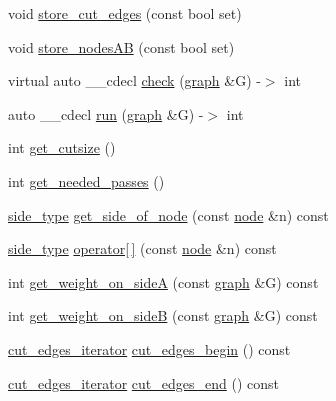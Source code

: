 \begin{DoxyCompactItemize}
\item 
void \mbox{\hyperlink{classfm__partition_ad0870674a1fb8e1c882f6855e32aec09}{store\+\_\+cut\+\_\+edges}} (const bool set)
\item 
void \mbox{\hyperlink{classfm__partition_a8926005b4637055d2acf6f29ad2d9b97}{store\+\_\+nodes\+AB}} (const bool set)
\item 
virtual auto \+\_\+\+\_\+cdecl \mbox{\hyperlink{classfm__partition_a2fadbf126742f659878132159653e102}{check}} (\mbox{\hyperlink{classgraph}{graph}} \&G) -\/$>$ int
\item 
auto \+\_\+\+\_\+cdecl \mbox{\hyperlink{classfm__partition_a509615ef1f11bc2334a96c35adafd28e}{run}} (\mbox{\hyperlink{classgraph}{graph}} \&G) -\/$>$ int
\item 
int \mbox{\hyperlink{classfm__partition_a42fa2e19fb3fde093a1a05d0bd6d8ad1}{get\+\_\+cutsize}} ()
\item 
int \mbox{\hyperlink{classfm__partition_aa8aa84286a6939d17175fbf646ba3176}{get\+\_\+needed\+\_\+passes}} ()
\item 
\mbox{\hyperlink{classfm__partition_a7cdff1bea3740a287387e8408e16ca79}{side\+\_\+type}} \mbox{\hyperlink{classfm__partition_af5f6ad817fe30760f3bc5470bd70c4c9}{get\+\_\+side\+\_\+of\+\_\+node}} (const \mbox{\hyperlink{classnode}{node}} \&n) const
\item 
\mbox{\hyperlink{classfm__partition_a7cdff1bea3740a287387e8408e16ca79}{side\+\_\+type}} \mbox{\hyperlink{classfm__partition_a45ef6bc577ce894ead2c699678e26f1b}{operator\mbox{[}$\,$\mbox{]}}} (const \mbox{\hyperlink{classnode}{node}} \&n) const
\item 
int \mbox{\hyperlink{classfm__partition_a3f1ddcff1ba7a4c4090f947f918b5331}{get\+\_\+weight\+\_\+on\+\_\+sideA}} (const \mbox{\hyperlink{classgraph}{graph}} \&G) const
\item 
int \mbox{\hyperlink{classfm__partition_a9e380da1dc654fcffdf4ac2418c6ef80}{get\+\_\+weight\+\_\+on\+\_\+sideB}} (const \mbox{\hyperlink{classgraph}{graph}} \&G) const
\item 
\mbox{\hyperlink{classfm__partition_aede10aea3dda6be8014ce60fca728efe}{cut\+\_\+edges\+\_\+iterator}} \mbox{\hyperlink{classfm__partition_a36990b62c6d2d9e4948f42d805afc626}{cut\+\_\+edges\+\_\+begin}} () const
\item 
\mbox{\hyperlink{classfm__partition_aede10aea3dda6be8014ce60fca728efe}{cut\+\_\+edges\+\_\+iterator}} \mbox{\hyperlink{classfm__partition_af213672f08e03878183659fa8c2ed61e}{cut\+\_\+edges\+\_\+end}} () const
\item 

\end{DoxyCompactItemize}
